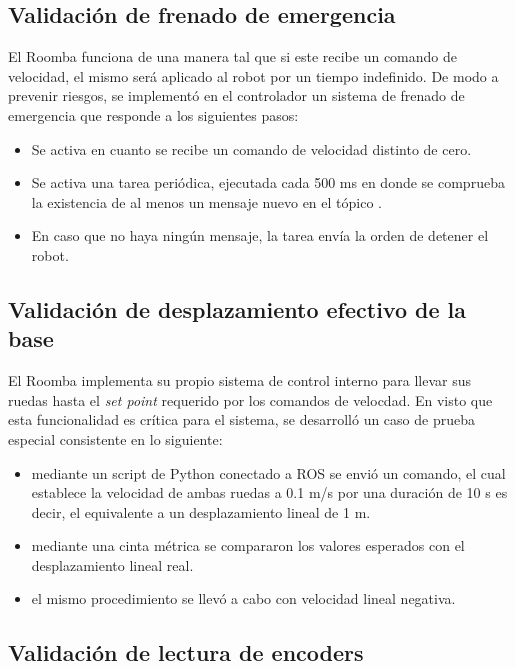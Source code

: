 \subsection{Validación de frenado de emergencia}

El Roomba funciona de una manera tal que si este recibe un comando de velocidad, el mismo será aplicado al robot por un tiempo indefinido. De modo a prevenir riesgos, se implementó en el controlador un sistema de frenado de emergencia que responde a los siguientes pasos:

\begin{itemize}
    \item Se activa en cuanto se recibe un comando de velocidad distinto de cero.
    \item Se activa una tarea periódica, ejecutada cada 500 ms en donde se comprueba la existencia de al menos un mensaje nuevo en el tópico .
    \item En caso que no haya ningún mensaje, la tarea envía la orden de detener el robot.
\end{itemize}

\subsection{Validación de desplazamiento efectivo de la base}

El Roomba implementa su propio sistema de control interno para llevar sus ruedas hasta el \textit{set point} requerido por los comandos de velocdad. En visto que esta funcionalidad es crítica para el sistema, se desarrolló un caso de prueba especial consistente en lo siguiente:

\begin{itemize}
    \item mediante un script de Python conectado a ROS se envió un comando, el cual establece la velocidad de ambas ruedas a 0.1 m/s por una duración de 10 s es decir, el equivalente a un desplazamiento lineal de 1 m.
    \item mediante una cinta métrica se compararon los valores esperados con el desplazamiento lineal real.
    \item el mismo procedimiento se llevó a cabo con velocidad lineal negativa.
\end{itemize}

\subsection{Validación de lectura de encoders}

